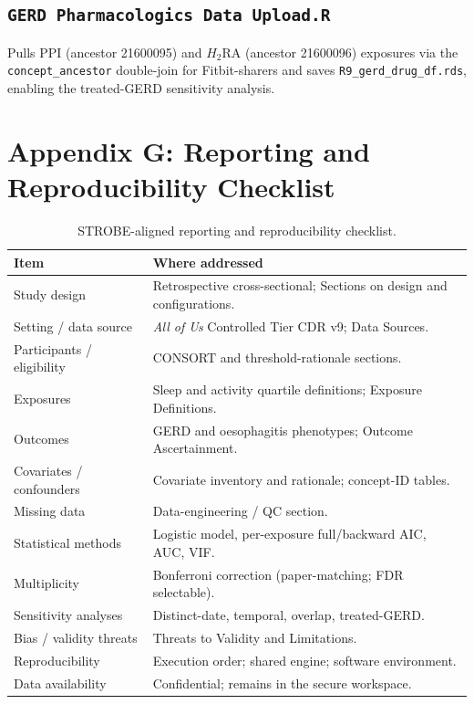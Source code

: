 \documentclass[11pt]{article}
\newcommand{\code}[1]{\texttt{\small #1}}
\begin{document}
\subsection{\code{GERD Pharmacologics Data Upload.R}}
Pulls PPI (ancestor 21600095) and $H_2$RA (ancestor 21600096) exposures via the \code{concept_ancestor}
double-join for Fitbit-sharers and saves \code{R9_gerd_drug_df.rds}, enabling the treated-GERD
sensitivity analysis.

\section{Appendix G: Reporting and Reproducibility Checklist}
\begin{table}[h]
\centering
\footnotesize
\begin{tabular}{@{}p{4.6cm}p{8.9cm}@{}}
\toprule
\textbf{Item} & \textbf{Where addressed} \\
\midrule
Study design & Retrospective cross-sectional; Sections on design and configurations. \\
Setting / data source & \emph{All of Us} Controlled Tier CDR v9; Data Sources. \\
Participants / eligibility & CONSORT and threshold-rationale sections. \\
Exposures & Sleep and activity quartile definitions; Exposure Definitions. \\
Outcomes & GERD and oesophagitis phenotypes; Outcome Ascertainment. \\
Covariates / confounders & Covariate inventory and rationale; concept-ID tables. \\
Missing data & Data-engineering / QC section. \\
Statistical methods & Logistic model, per-exposure full/backward AIC, AUC, VIF. \\
Multiplicity & Bonferroni correction (paper-matching; FDR selectable). \\
Sensitivity analyses & Distinct-date, temporal, overlap, treated-GERD. \\
Bias / validity threats & Threats to Validity and Limitations. \\
Reproducibility & Execution order; shared engine; software environment. \\
Data availability & Confidential; remains in the secure workspace. \\
\bottomrule
\end{tabular}
\caption{STROBE-aligned reporting and reproducibility checklist.}
\end{table}
\end{document}
